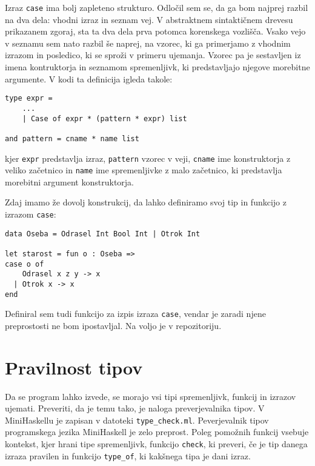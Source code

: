 \documentclass[12pt,a4paper,openany]{book}
\begin{document}
Izraz \lstinline{case} ima bolj zapleteno strukturo. Odločil sem se, da ga bom najprej razbil na dva dela: vhodni izraz in seznam vej. V abstraktnem sintaktičnem drevesu prikazanem zgoraj, 
sta ta dva dela prva potomca korenskega vozlišča. Vsako vejo v seznamu sem nato razbil še naprej, na vzorec, ki ga primerjamo z vhodnim izrazom in posledico, ki se sproži v primeru ujemanja. 
Vzorec pa je sestavljen iz imena kontruktorja in seznamom spremenljivk, ki predstavljajo njegove morebitne argumente. V kodi ta definicija igleda takole:
\begin{lstlisting}
type expr =
    ...
    | Case of expr * (pattern * expr) list

and pattern = cname * name list
\end{lstlisting}
kjer \lstinline{expr} predstavlja izraz, \lstinline{pattern} vzorec v veji, \lstinline{cname} ime konstruktorja z veliko začetnico in \lstinline{name} ime spremenljivke z malo začetnico, ki predstavlja morebitni 
argument konstruktorja. 

Zdaj imamo že dovolj konstrukcij, da lahko definiramo svoj tip in funkcijo z izrazom \lstinline{case}: 
\begin{lstlisting}
data Oseba = Odrasel Int Bool Int | Otrok Int

let starost = fun o : Oseba => 
case o of 
    Odrasel x z y -> x 
  | Otrok x -> x
end
\end{lstlisting}

Definiral sem tudi funkcijo za izpis izraza \lstinline{case}, vendar je zaradi njene preprostosti ne bom ipostavljal. Na voljo je v repozitoriju.

\section{Pravilnost tipov}
 Da se program lahko izvede, se morajo vsi tipi spremenljivk, funkcij in izrazov ujemati. Preveriti, da je temu tako, je naloga preverjevalnika tipov. V MiniHaskellu je zapisan v datoteki 
 \lstinline{type_check.ml}. Peverjevalnik tipov programskega jezika MiniHaskell je zelo preprost. Poleg pomožnih funkcij vsebuje kontekst, kjer hrani tipe spremenljivk, funkcijo \lstinline{check}, 
 ki preveri, če je tip danega izraza pravilen in funkcijo \lstinline{type_of}, ki kakšnega tipa je dani izraz.
 
\end{document}
